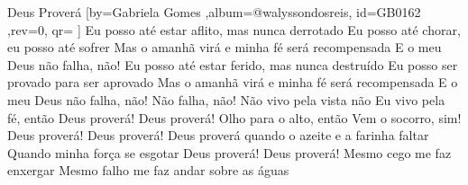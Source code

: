 \beginsong
{Deus Proverá %
}[by={Gabriela Gomes  %
},album={@walyssondosreis},
id={GB0162 %
},rev={0}, %
qr={ %
}]
\beginverse
Eu posso até estar aflito, mas nunca derrotado
Eu posso até chorar, eu posso até sofrer
Mas o amanhã virá e minha fé será recompensada
E o meu Deus não falha, não!
\endverse
\beginverse
Eu posso até estar ferido, mas nunca destruído
Eu posso ser provado para ser aprovado
Mas o amanhã virá e minha fé será recompensada
E o meu Deus não falha, não!
Não falha, não!
\endverse
\beginverse
Não vivo pela vista não
Eu vivo pela fé, então
Deus proverá! Deus proverá!
Olho para o alto, então
Vem o socorro, sim!
Deus proverá! Deus proverá!
\endverse
\beginchorus
Deus proverá quando o azeite e a farinha faltar
Quando minha força se esgotar
Deus proverá! Deus proverá!
Mesmo cego me faz enxergar
Mesmo falho me faz andar sobre as águas
\endchorus
\begin{comment}
\lstset{basicstyle=\scriptsize\bf} %
\tab{Solo 1}
\begin{lstlisting}
E|-----------------------------------------------------|
B|-----------------------------------------------------|
G|-----------------------------------------------------|
D|-----------------------------------------------------|
A|-----------------------------------------------------|
E|-----------------------------------------------------|
\end{lstlisting}
\end{comment}
\vspace{2em} 
\color{drawChord}%
\color{drawChord}%
